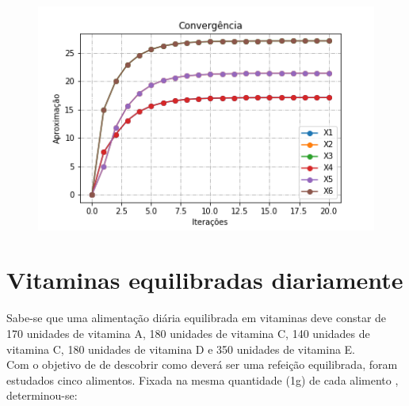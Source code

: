 \documentclass[
12pt,				%
openright,			%
twoside,			%
a4paper,			%
english,			%
french,				%
spanish,			%
brazil				%
]{abntex2_new}
\begin{document}
\begin{alineas}
			\begin{figure}[htb]
				\includegraphics[scale=1]{grafico1.png}
			\end{figure}
		\end{alineas}
		
		
		
		
		
		\section{Vitaminas equilibradas diariamente}
		Sabe-se que uma alimentação diária equilibrada em vitaminas deve constar
		de 170 unidades de vitamina A,
		180 unidades de vitamina C, 140 unidades
		de vitamina C, 180 unidades de vitamina D
		e 350 unidades de vitamina E.\\
		Com o objetivo de de descobrir como deverá
		ser uma refeição equilibrada, foram
		estudados cinco alimentos. Fixada na mesma quantidade (1g) de cada alimento
		, determinou-se:
		
\end{document}
